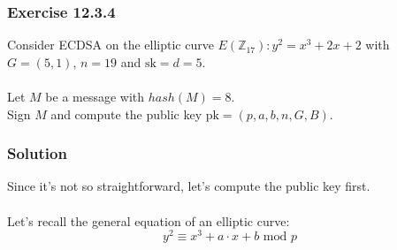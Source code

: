 \documentclass[11pt, a4paper]{article}
\newcommand{\mymod}{
    \text{ mod }
}
\begin{document}
\subsubsection{Exercise 12.3.4}
Consider ECDSA on the elliptic curve $E(\mathbb{Z}_{17}):y^2=x^3+2x+2$ with $G=(5,1)$, $n=19$ and $\text{sk}=d=5$.\\\\
Let $M$ be a message with $hash(M)=8$.\\
Sign $M$ and compute the public key $\text{pk}=(p,a,b,n,G,B)$.

\subsubsection*{Solution}
Since it's not so straightforward, let's compute the public key first.\\\\
Let's recall the general equation of an elliptic curve:
$$y^2\equiv x^3+a\cdot x+b\mymod p$$
\end{document}
